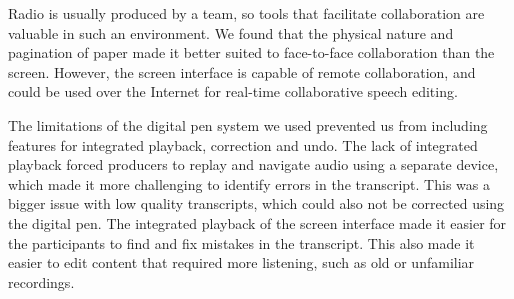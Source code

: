 Radio is usually produced by a team, so tools that facilitate collaboration are valuable in such an environment.  We
found that the physical nature and pagination of paper made it better suited to face-to-face collaboration than the
screen.  However, the screen interface is capable of remote collaboration, and could be used over the Internet for
real-time collaborative speech editing.

The limitations of the digital pen system we used prevented us from including features for integrated playback,
correction and undo. The lack of integrated playback forced producers to replay and navigate audio using a separate
device, which made it more challenging to identify errors in the transcript. This was a bigger issue with low
quality transcripts, which could also not be corrected using the digital pen.  The integrated playback of the screen
interface made it easier for the participants to find and fix mistakes in the transcript.  This also made it
easier to edit content that required more listening, such as old or unfamiliar recordings.
















































































